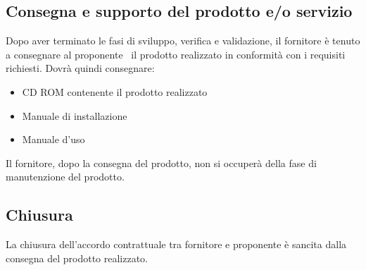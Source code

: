 \documentclass[../NormeDiProgetto.tex]{subfiles}
\begin{document}
		\subsection{Consegna e supporto del prodotto e/o servizio}
			Dopo aver terminato le fasi di sviluppo, verifica e validazione, il fornitore è tenuto a consegnare al proponente \proponente\ il prodotto realizzato in conformità con i requisiti richiesti. Dovrà quindi consegnare:
			\begin{itemize}
				\item CD ROM contenente il prodotto realizzato
				\item Manuale di installazione
				\item Manuale d'uso
			\end{itemize}
			Il fornitore, dopo la consegna del prodotto, non si occuperà della fase di manutenzione del prodotto.
		\subsection{Chiusura}
			La chiusura dell'accordo contrattuale tra fornitore e proponente è sancita dalla consegna del prodotto realizzato.
\end{document}
